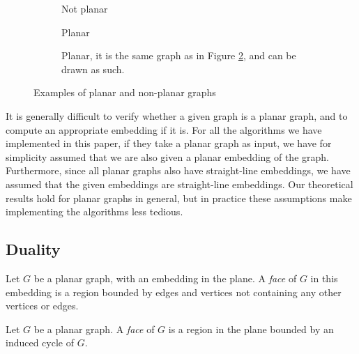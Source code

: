 \begin{figure}
    \centering
    \begin{subfigure}{.3\textwidth}
        \centering
        
        \caption{Not planar}
        \label{k33}
    \end{subfigure}%
    \begin{subfigure}{.3\textwidth}
        \centering
        
        \caption{Planar}
        \label{k4-a}
    \end{subfigure}%
    \begin{subfigure}{.3\textwidth}
        \centering
        
        \caption{Planar, it is the same graph as in Figure \ref{k4-a}, and can be drawn as such.}
        \label{k4-b}
    \end{subfigure}
    \caption{Examples of planar and non-planar graphs}
\end{figure}

It is generally difficult to verify whether a given graph is a planar graph, and to compute an appropriate embedding if it is. For all the algorithms we have implemented in this paper, if they take a planar graph as input, we have for simplicity assumed that we are also given a planar embedding of the graph. Furthermore, since all planar graphs also have straight-line embeddings, we have assumed that the given embeddings are straight-line embeddings. Our theoretical results hold for planar graphs in general, but in practice these assumptions make implementing the algorithms less tedious.

\subsection{Duality}
\begin{definition}[Face]
     Let $G$ be a planar graph, with an embedding in the plane. A \emph{face} of $G$ in this embedding is a region bounded by edges and vertices not containing any other vertices or edges.
    
    Let $G$ be a planar graph. A \emph{face} of $G$ is a region in the plane bounded by an induced cycle of $G$.
\end{definition}

